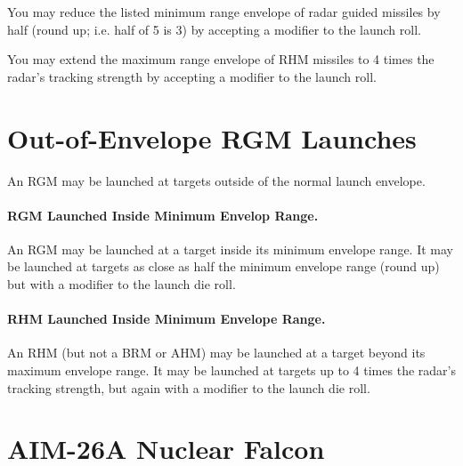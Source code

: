 \begin{advancedrules}
{You may reduce the listed minimum range envelope of radar guided missiles by half (round up; i.e. half of 5 is 3) by accepting a  modifier to the launch roll.

You may extend the maximum range envelope of RHM missiles to 4 times the radar's tracking strength by accepting a  modifier to the launch roll.

}{

\section{Out-of-Envelope RGM Launches}
\label{rule:radar-out-of-envelope-launches}

An RGM may be launched at targets outside of the normal launch envelope.

\paragraph{RGM Launched Inside Minimum Envelop Range.} An RGM may be launched at a target inside its minimum envelope range. It may be launched at targets as close as half the minimum envelope range (round up) but with a  modifier to the launch die roll.

\paragraph{RHM Launched Inside Minimum Envelope Range.} An RHM (but not a BRM or AHM) may be launched at a target beyond its maximum envelope range. It may be launched at targets up to 4 times the radar's tracking strength, but again with a  modifier to the launch die roll.

}

\section{AIM-26A Nuclear Falcon}

\end{advancedrules}
